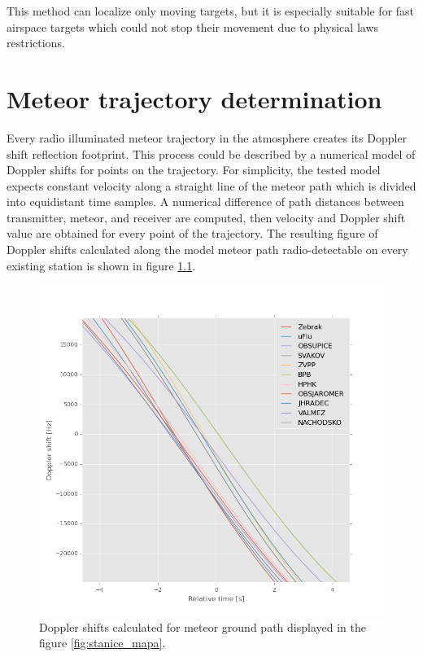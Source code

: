 \documentclass[twoside]{ctuthesis}
\theoremstyle{plain}
\theoremstyle{definition}
\theoremstyle{note}
\begin{document}
This method can localize only moving targets, but it is especially suitable for fast airspace targets which could not stop their movement due to physical laws restrictions. 

\chapter{Meteor trajectory determination}

Every radio illuminated meteor trajectory in the atmosphere creates its Doppler shift reflection footprint.  This process could be described by a numerical model of Doppler shifts for points on the trajectory. For simplicity, the tested model expects constant velocity along a straight line of the meteor path which is divided into equidistant time samples. A numerical difference of path distances between transmitter, meteor, and receiver are computed, then velocity and Doppler shift value are obtained for every point of the trajectory. 
The resulting figure of Doppler shifts calculated along the model meteor path radio-detectable on every existing station is shown in figure \ref{fig:dopplers}. 

\begin{figure}
 \begin{center}
 \includegraphics[width=\textwidth]{./img/Meteor_dopplers.png}
 \caption{Doppler shifts calculated for meteor ground path displayed in the figure \ref{fig:stanice_mapa}.}
  \label{fig:dopplers} 
 \end{center}
\end{figure}
\end{document}
